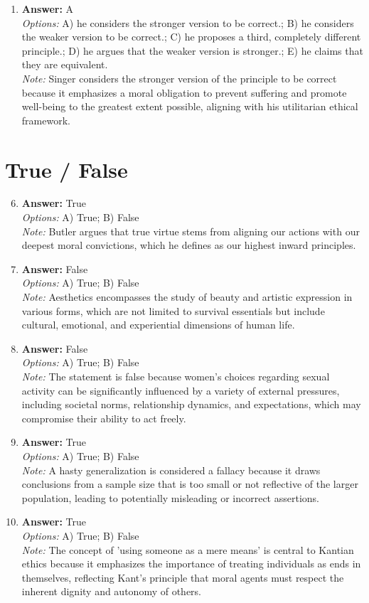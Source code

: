 \documentclass[12pt]{article}
\begin{document}
\begin{enumerate}[label=\arabic*.]
\item \textbf{Answer:} A
\\ \textit{Options:} A) he considers the stronger version to be correct.; B) he considers the weaker version to be correct.; C) he proposes a third, completely different principle.; D) he argues that the weaker version is stronger.; E) he claims that they are equivalent.
\\ \textit{Note:} Singer considers the stronger version of the principle to be correct because it emphasizes a moral obligation to prevent suffering and promote well-being to the greatest extent possible, aligning with his utilitarian ethical framework.
\end{enumerate}

\section*{True / False}
\begin{enumerate}[label=\arabic*.]
\setcounter{enumi}{5}
\item \textbf{Answer:} True
\\ \textit{Options:} A) True; B) False
\\ \textit{Note:} Butler argues that true virtue stems from aligning our actions with our deepest moral convictions, which he defines as our highest inward principles.
\item \textbf{Answer:} False
\\ \textit{Options:} A) True; B) False
\\ \textit{Note:} Aesthetics encompasses the study of beauty and artistic expression in various forms, which are not limited to survival essentials but include cultural, emotional, and experiential dimensions of human life.
\item \textbf{Answer:} False
\\ \textit{Options:} A) True; B) False
\\ \textit{Note:} The statement is false because women's choices regarding sexual activity can be significantly influenced by a variety of external pressures, including societal norms, relationship dynamics, and expectations, which may compromise their ability to act freely.
\item \textbf{Answer:} True
\\ \textit{Options:} A) True; B) False
\\ \textit{Note:} A hasty generalization is considered a fallacy because it draws conclusions from a sample size that is too small or not reflective of the larger population, leading to potentially misleading or incorrect assertions.
\item \textbf{Answer:} True
\\ \textit{Options:} A) True; B) False
\\ \textit{Note:} The concept of 'using someone as a mere means' is central to Kantian ethics because it emphasizes the importance of treating individuals as ends in themselves, reflecting Kant's principle that moral agents must respect the inherent dignity and autonomy of others.
\end{enumerate}
\end{document}
